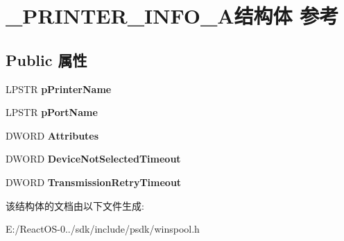 \hypertarget{struct___p_r_i_n_t_e_r___i_n_f_o__5_a}{}\section{\+\_\+\+P\+R\+I\+N\+T\+E\+R\+\_\+\+I\+N\+F\+O\+\_\+A结构体 参考}
\label{struct___p_r_i_n_t_e_r___i_n_f_o__5_a}
\subsection*{Public 属性}
\begin{DoxyCompactItemize}
\item 
\mbox{\label{struct___p_r_i_n_t_e_r___i_n_f_o__5_a_a78d71cb0fd039077b798c56a8ca1b2a3}} 
L\+P\+S\+TR {\bfseries p\+Printer\+Name}
\item 
\mbox{\label{struct___p_r_i_n_t_e_r___i_n_f_o__5_a_a328418071b668a6e99c757c5a48c754a}} 
L\+P\+S\+TR {\bfseries p\+Port\+Name}
\item 
\mbox{\label{struct___p_r_i_n_t_e_r___i_n_f_o__5_a_a04b66a528c3367dc343f5987ef6430d5}} 
D\+W\+O\+RD {\bfseries Attributes}
\item 
\mbox{\label{struct___p_r_i_n_t_e_r___i_n_f_o__5_a_a10e8e735259820edc6a4f94da0961c74}} 
D\+W\+O\+RD {\bfseries Device\+Not\+Selected\+Timeout}
\item 
\mbox{\label{struct___p_r_i_n_t_e_r___i_n_f_o__5_a_adecd69e635ee0227f825f1630389a7f2}} 
D\+W\+O\+RD {\bfseries Transmission\+Retry\+Timeout}
\end{DoxyCompactItemize}


该结构体的文档由以下文件生成\+:\begin{DoxyCompactItemize}
\item 
E\+:/\+React\+O\+S-\/0../sdk/include/psdk/winspool.\+h\end{DoxyCompactItemize}
